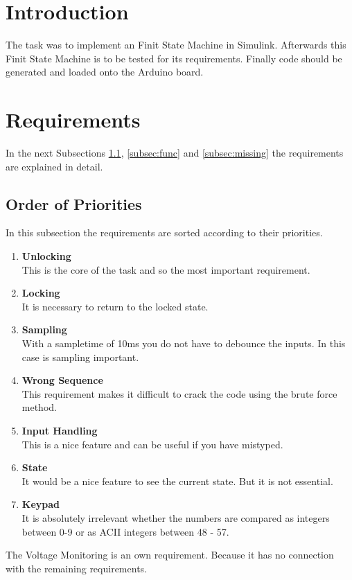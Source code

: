 \section*{Introduction}
The task was to implement an Finit State Machine in Simulink.
Afterwards this Finit State Machine is to be tested for its requirements.
Finally code should be generated and loaded onto the Arduino board. 

\section{Requirements}
In the next Subsections \ref{subsec:prio}, \ref{subsec:func} and \ref{subsec:missing} the requirements are explained in detail.


	\subsection{Order of Priorities} \label{subsec:prio}
	In this subsection the requirements are sorted according to their priorities.
		\begin{enumerate}
			\item \textbf{Unlocking}\\
				This is the core of the task and so the most important requirement.
			\item \textbf{Locking}\\
				It is necessary to return to the locked state.
			\item \textbf{Sampling}\\
				With a sampletime of 10ms you do not have to debounce the inputs. In this case is sampling important.							
			\item \textbf{Wrong Sequence}\\
				This requirement makes it difficult to crack the code using the brute force method.
			\item \textbf{Input Handling}\\
				This is a nice feature and can be useful if you have mistyped.
			\item \textbf{State}\\
				It would be a nice feature to see the current state. But it is not essential.		
			\item \textbf{Keypad}\\
				It is absolutely irrelevant whether the numbers are compared as integers between 0-9 or as ACII integers between 48 - 57.
		\end{enumerate}	
The Voltage Monitoring is an own requirement. Because it has no connection with the remaining requirements.
	
